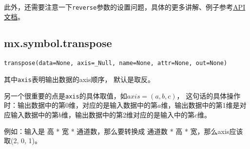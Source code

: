 此外，还需要注意一下\verb|reverse|参数的设置问题，具体的更多讲解、例子参考\href{https://mxnet.incubator.apache.org/api/python/symbol/symbol.html?highlight=reshape#mxnet.symbol.reshape}{API文档}。


\subsection{mx.symbol.transpose}

\begin{verbatim}
transpose(data=None, axis=_Null, name=None, attr=None, out=None)
\end{verbatim}

其中\verb|axis|表明输出数据的axis顺序， 默认是取反。

另一个很重要的点是\verb|axis|的具体取值，如$axis=(a, b, c)$， 这句话的具体操作时：输出数据中的第0维，对应的是输入数据中的第$a$维，输出数据中的第1维是对应输入数据中的第$b$维，输出数据中的第2维对应的是输入中的第$c$维。

例如：输入是 高 * 宽 * 通道数，那么要转换成 通道数 * 高 * 宽，那么axis应该取(2, 0, 1)。



